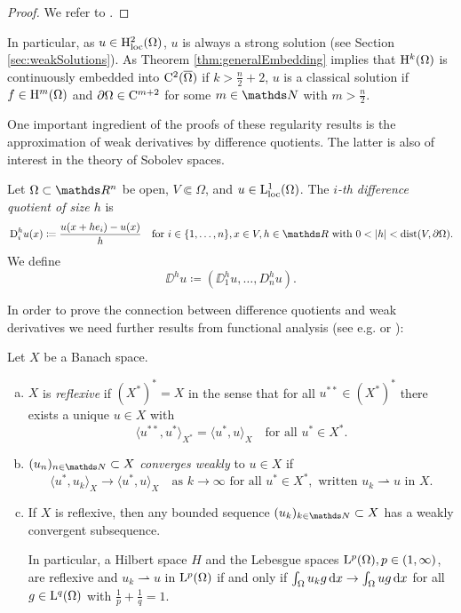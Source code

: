 \begin{proof}
  We refer to \cite[Theorems 1--6 in Section 6.3 and Theorem 6 in Section 6.2]{evans2010partial}.
\end{proof}

In particular, as $u \in \mathrm{H}_{\operatorname{loc}}^2(\Omega)$, $u$ is always a strong solution (see Section \ref{sec:weakSolutions}).
As Theorem \ref{thm:generalEmbedding} implies that $\mathrm{H}^k(\Omega)$ is continuously embedded into $\mathrm{C}^2(\overline\Omega)$ if $k > \frac{n}{2} + 2$, $u$ is a classical solution if $f \in \mathrm{H}^m(\Omega)$ and $\partial\Omega \in \mathrm{C}^{m + 2}$ for some $m \in \N$ with $m > \frac{n}{2}$.

One important ingredient of the proofs of these regularity results is the approximation of weak derivatives by difference quotients.
The latter is also of interest in the theory of Sobolev spaces.

\begin{defn}
  Let $\Omega \subset \R^n$ be open, $V \Subset \Omega$, and $u \in \mathrm{L}^1_{\operatorname{loc}}(\Omega)$.
  The \emph{$i$-th difference quotient of size $h$} is
  $$
  \DD_i^h u(x) \coloneqq \frac{u(x + he_i) - u(x)}{h} \quad\text{for } i \in \{1, \dots,n\}, x \in V, h \in \R \text{ with } 0 < |h| < \dist(V, \partial \Omega).
  $$
  We define
  $$
  \DD^h u\coloneqq ( \DD_1^h u, \dots,D_n^h u).
  $$
\end{defn}

In order to prove the connection between difference quotients and weak derivatives we need further results from functional analysis (see e.g. \cite{dobrowolski2010angewandte} or \cite{alt2012lineare}):

\begin{prop}
  \label{prop:banachAlaoglu}
  Let $X$ be a Banach space.
  \begin{enumerate}[a)]
    \item $X$ is \emph{reflexive} if $(X^*)^* = X$ in the sense that for all $u^{**} \in (X^*)^*$ there exists a unique $u \in X$ with
      $$
      \langle u^{**}, u^* \rangle_{X^*} = \langle u^*, u \rangle_X \quad\text{for all } u^* \in X^*.
      $$
    \item $(u_n)_{n \in \N} \subset X$ \emph{converges weakly} to $u \in X$ if 
      $$
      \langle u^*, u_k \rangle_X \to \langle u^*, u \rangle_X \quad\text{as } k\to \infty \text{ for all } u^* \in X^*, \text{ written } u_k \rightharpoonup u \text{ in } X.
      $$
    \item If $X$ is reflexive, then any bounded sequence $(u_k)_{k \in \N} \subset X$ has a weakly convergent subsequence.

      In particular, a Hilbert space $H$ and the Lebesgue spaces $\mathrm{L}^p(\Omega), p \in (1,\infty)$, are reflexive and $u_k \rightharpoonup u$ in $\mathrm{L}^p(\Omega)$ if and only if $\int_\Omega u_k g \, {\operatorname{d}\!{x}} \to \int_\Omega u g \, {\operatorname{d}\!{x}}$ for all $g \in \mathrm{L}^q(\Omega)$ with $\frac{1}{p} + \frac{1}{q} = 1$.
  \end{enumerate}
\end{prop}

